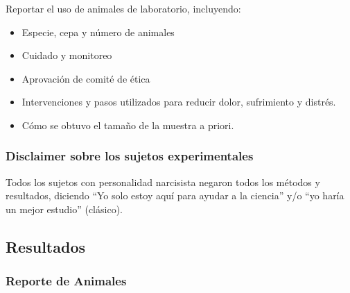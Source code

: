 \documentclass[
  10pt]{article}
\providecommand{\tightlist}{%
  \setlength{\itemsep}{0pt}\setlength{\parskip}{0pt}}\usepackage{longtable,booktabs,array}
\begin{document}
\begin{tcolorbox}
\end{tcolorbox}

\begin{tcolorbox}[enhanced jigsaw, colframe=quarto-callout-tip-color-frame, colback=white, colbacktitle=quarto-callout-tip-color!10!white, leftrule=.75mm, left=2mm, breakable, coltitle=black, toptitle=1mm, bottomtitle=1mm, rightrule=.15mm, titlerule=0mm, title=\textcolor{quarto-callout-tip-color}{\faLightbulb}\hspace{0.5em}{Animales de Laboratorio}, arc=.35mm, bottomrule=.15mm, opacitybacktitle=0.6, opacityback=0, toprule=.15mm]

Reportar el uso de animales de laboratorio, incluyendo:

\begin{itemize}
\tightlist
\item
  Especie, cepa y número de animales
\item
  Cuidado y monitoreo
\item
  Aprovación de comité de ética
\item
  Intervenciones y pasos utilizados para reducir dolor, sufrimiento y
  distrés.
\item
  Cómo se obtuvo el tamaño de la muestra a priori.
\end{itemize}

\end{tcolorbox}

\subsubsection{Disclaimer sobre los sujetos
experimentales}\label{disclaimer-sobre-los-sujetos-experimentales}

Todos los sujetos con personalidad narcisista negaron todos los métodos
y resultados, diciendo ``Yo solo estoy aquí para ayudar a la ciencia''
y/o ``yo haría un mejor estudio'' (clásico).

\subsection{Resultados}\label{resultados}

\subsubsection{Reporte de Animales}\label{reporte-de-animales}
\end{document}
